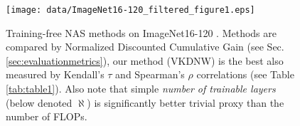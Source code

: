 
\begin{figure}
    \centering    
    \texttt{[image: data/ImageNet16-120\_filtered\_figure1.eps]} \vspace{-5pt}
    \caption{Training-free NAS methods on 
ImageNet16-120 \cite{dong2020bench}. Methods are compared by Normalized Discounted Cumulative Gain (see Sec. \ref{sec:evaluationmetrics}), our method (VKDNW) is the best also measured by Kendall's $\tau$ and Spearman's $\rho$ correlations (see Table \ref{tab:table1}). Also note that simple \textit{number of trainable layers} (below denoted $\aleph$) is significantly better trivial proxy than the number of FLOPs.
\vspace{-5pt}}
    \label{fig:example_bad_kendall}
\end{figure}